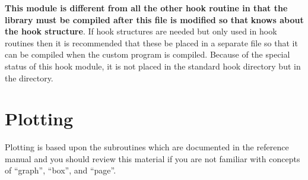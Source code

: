 \textbf{This module is different from all the other hook routine in that the \tao
library must be compiled after this file is modified so that} 
\textbf{knows about the hook structure}. If hook structures are needed but only used in
hook routines then it is recommended that these be placed in a separate file so
that it can be compiled when the custom \tao program is compiled. Because of the
special status of this hook module, it is not placed in the standard hook
directory but in the  directory.

\chapter{Plotting}
\label{s:prog_plotting} 

Plotting is based upon the  subroutines which are
documented in the \bmad reference manual and you should review this
material if you are not familiar with concepts of ``graph'', ``box'',
and ``page''. 


